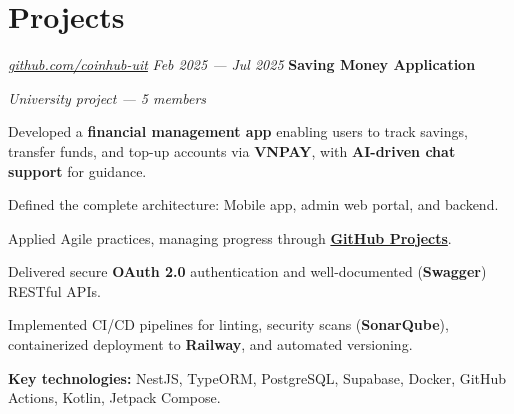 \section{Projects}

\begin{twocolentry}{
		\textit{\href{https://github.com/coinhub-uit}{github.com/coinhub-uit}}
		\textit{Feb 2025 --- Jul 2025}
	}
	\textbf{Saving Money Application}

	\textit{University project — 5 members}
\end{twocolentry}

\begin{onecolentry}
	\begin{highlights}
		\item Developed a \textbf{financial management app} enabling users to track savings, transfer funds, and
		top-up accounts via \textbf{VNPAY}, with \textbf{AI-driven chat support} for guidance.
		\item Defined the complete architecture: Mobile app, admin web portal, and backend.
		\item Applied Agile practices, managing progress through
		\textbf{\href{https://github.com/orgs/coinhub-uit/projects/1}{GitHub Projects}}.
		\item Delivered secure \textbf{OAuth 2.0} authentication and well-documented (\textbf{Swagger}) RESTful APIs.
		\item Implemented CI/CD pipelines for linting, security scans (\textbf{SonarQube}), containerized
		deployment to \textbf{Railway}, and automated versioning.
		\item \textbf{Key technologies:} NestJS, TypeORM, PostgreSQL, Supabase, Docker, GitHub Actions, Kotlin,
		Jetpack Compose.
	\end{highlights}
\end{onecolentry}
